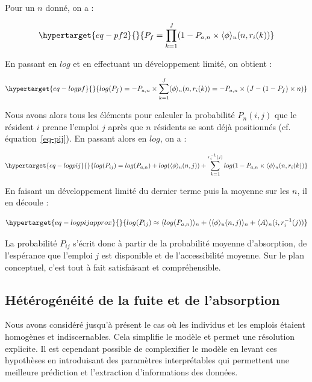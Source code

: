 \documentclass[
  10pt,
  a4paper,
  numbers=noendperiod,
  DIV=12]{scrartcl}
\begin{document}
Pour un \(n\) donné, on a :

\begin{equation}\protect\hypertarget{eq-pf2}{}{
P_f=\prod_{k=1}^J(1-P_{a,n}\times \langle \phi \rangle_u(n, r_i(k))
}\label{eq-pf2}\end{equation}

En passant en \(log\) et en effectuant un développement limité, on
obtient :

\begin{equation}\protect\hypertarget{eq-logpf}{}{
log(P_f)=-P_{a,n}\times\sum_{k=1}^J \langle \phi \rangle_u(n,r_i(k))=-P_{a,n}\times(J-(1-P_f)\times n)
}\label{eq-logpf}\end{equation}

Nous avons alors tous les éléments pour calculer la probabilité
\(P_n(i,j)\) que le résident \(i\) prenne l'emploi \(j\) après que \(n\)
résidents se sont déjà positionnés (cf. équation~\ref{eq-pij}). En
passant alors en \(log\), on a :

\begin{equation}\protect\hypertarget{eq-logpij}{}{
log(P_{ij})=log(P_{a,n})+log(\langle\phi \rangle_u(n,j))+\sum_{k=1}^{r_i^{-1}(j)}log(1-P_{a,n}\times \langle \phi \rangle_u(n,r_i(k))
}\label{eq-logpij}\end{equation}

En faisant un développement limité du dernier terme puis la moyenne sur
les \(n\), il en découle :

\begin{equation}\protect\hypertarget{eq-logpijapprox}{}{
log(P_{ij})\approx\langle log(P_{a,n})\rangle _n+\langle\langle\phi\rangle_u(n,j)\rangle_n + \langle A\rangle_n(i, r_i^{-1}(j))
}\label{eq-logpijapprox}\end{equation}

La probabilité \(P_{ij}\) s'écrit donc à partir de la probabilité
moyenne d'absorption, de l'espérance que l'emploi \(j\) est disponible
et de l'accessibilité moyenne. Sur le plan conceptuel, c'est tout à fait
satisfaisant et compréhensible.

\hypertarget{sec-hetero}{%
\subsection{Hétérogénéité de la fuite et de
l'absorption}\label{sec-hetero}}

Nous avons considéré jusqu'à présent le cas où les individus et les
emplois étaient homogènes et indiscernables. Cela simplifie le modèle et
permet une résolution explicite. Il est cependant possible de
complexifier le modèle en levant ces hypothèses en introduisant des
paramètres interprétables qui permettent une meilleure prédiction et
l'extraction d'informations des données.
\end{document}
